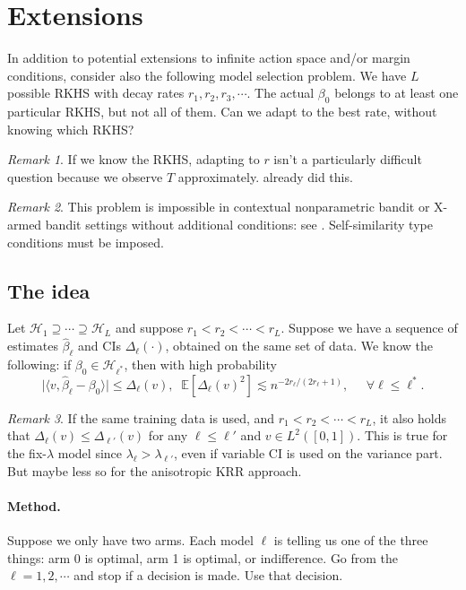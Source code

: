 \documentclass[11pt,a4paper]{article}
\renewcommand{\hat}{\widehat}
\theoremstyle{definition}
\theoremstyle{plain}
\theoremstyle{remark}
\newtheorem{remark}{Remark}[section]
\newcommand{\mH}{\mathcal H}
\begin{document}
\section{Extensions}

In addition to potential extensions to infinite action space and/or margin conditions, consider also the following model selection problem. We have $L$ possible RKHS with decay rates $r_1,r_2,r_3,\cdots$.
The actual $\beta_0$ belongs to at least one particular RKHS, but not all of them. Can we adapt to the best rate, without knowing which RKHS?

\begin{remark}
If we know the RKHS, adapting to $r$ isn't a particularly difficult question because we observe $T$ approximately. \cite{cai2012minimax} already did this.
\end{remark}

\begin{remark}
This problem is impossible in contextual nonparametric bandit or X-armed bandit settings without additional conditions: see \cite{gur2022smoothness,locatelli2018adaptivity}.
Self-similarity type conditions must be imposed.
\end{remark}

\subsection{The idea}

Let $\mH_1\supseteq\cdots\supseteq\mH_L$ and suppose $r_1<r_2<\cdots<r_L$.
Suppose we have a sequence of estimates $\hat \beta_\ell$ and CIs $\Delta_\ell(\cdot)$, obtained on the same set of data.
 We know the following: if $\beta_0\in\mH_{\ell^*}$, then with high probability
 $$
 \big|\langle v,\hat\beta_\ell-\beta_0\rangle\big|\leq \Delta_\ell(v),\;\; \mathbb E[\Delta_\ell(v)^2]\lesssim n^{-2r_\ell/(2r_\ell+1)},\;\;\;\;\;\forall \ell\leq \ell^*.
 $$
 
 \begin{remark}
 If the same training data is used, and $r_1<r_2<\cdots<r_L$, it also holds that $\Delta_\ell(v)\leq\Delta_{\ell'}(v)$ for any $\ell\leq \ell'$ and $v\in L^2([0,1])$.
 This is true for the fix-$\lambda$ model since $\lambda_\ell>\lambda_{\ell'}$, even if variable CI is used on the variance part.
 But maybe less so for the anisotropic KRR approach.
 \end{remark}
 
 \paragraph{Method.} Suppose we only have two arms. Each model $\ell$ is telling us one of the three things: arm 0 is optimal, arm 1 is optimal, or indifference. Go from the $\ell=1,2,\cdots$
 and stop if a decision is made. Use that decision.
 
\end{document}
